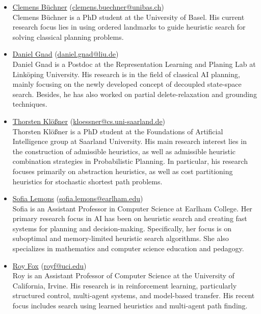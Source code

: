 \documentclass[10pt]{article}
\begin{document}
\newcommand{\organizer}[4]{\href{#2}{#1} (\href{mailto:#3}{#3})\\{#4}}
\begin{itemize}

\item \organizer{Clemens B\"uchner}{https://ai.dmi.unibas.ch/people/buechner/}{clemens.buechner@unibas.ch}
Clemens B\"uchner is a PhD student at the University of Basel. His current
research focus lies in using ordered landmarks to guide heuristic search for
solving classical planning problems.

\item \organizer{Daniel Gnad}{https://rlplab.com/daniel-gnad/}{daniel.gnad@liu.de}
Daniel Gnad is a Postdoc at the Representation Learning and Planing Lab at
Link\"oping University. His research is in the field of classical AI planning,
mainly focusing on the newly developed concept of decoupled state-space search.
Besides, he has also worked on partial delete-relaxation and grounding
techniques.

\item \organizer{Thorsten Kl\"o\ss{}ner}{http://fai.cs.uni-saarland.de/kloessner/}{kloessner@cs.uni-saarland.de}
Thorsten Kl\"o\ss{}ner is a PhD student at the Foundations of Artificial
Intelligence group at Saarland University. His main research interest lies in
the construction of admissible heuristics, as well as admissible heuristic
combination strategies in Probabilistic Planning. In particular, his research
focuses primarily on abstraction heuristics, as well as cost partitioning
heuristics for stochastic shortest path problems.

\item \organizer{Sofia Lemons}{https://earlham.edu/faculty-staff/sofia-lemons/}{sofia.lemons@earlham.edu}
Sofia is an Assistant Professor in Computer Science at Earlham
College. Her primary research focus in AI has been on heuristic search
and creating fast systems for planning and
decision-making. Specifically, her focus is on suboptimal and
memory-limited heuristic search algorithms. She also specializes in
mathematics and computer science education and pedagogy.

\item \organizer{Roy Fox}{https://royf.org}{royf@uci.edu}
Roy is an Assistant Professor of Computer Science at the University of California, Irvine.
His research is in reinforcement learning, particularly structured control, multi-agent systems, and model-based transfer.
His recent focus includes search using learned heuristics and multi-agent path finding.


\end{itemize}
\end{document}
